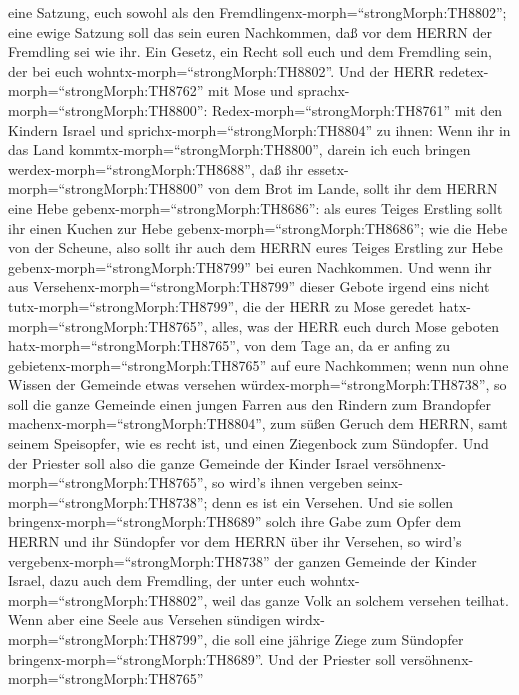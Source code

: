 eine Satzung, euch sowohl als den
Fremdlingenx-morph=``strongMorph:TH8802''; eine ewige Satzung soll das
sein euren Nachkommen, daß vor dem HERRN der Fremdling sei wie ihr.
 Ein Gesetz, ein Recht soll euch und dem Fremdling sein,
der bei euch wohntx-morph=``strongMorph:TH8802''.  Und der
HERR redetex-morph=``strongMorph:TH8762'' mit Mose und
sprachx-morph=``strongMorph:TH8800'': 
Redex-morph=``strongMorph:TH8761'' mit den Kindern Israel und
sprichx-morph=``strongMorph:TH8804'' zu ihnen: Wenn ihr in das Land
kommtx-morph=``strongMorph:TH8800'', darein ich euch bringen
werdex-morph=``strongMorph:TH8688'',  daß ihr
essetx-morph=``strongMorph:TH8800'' von dem Brot im Lande, sollt ihr dem
HERRN eine Hebe gebenx-morph=``strongMorph:TH8686'':  als
eures Teiges Erstling sollt ihr einen Kuchen zur Hebe
gebenx-morph=``strongMorph:TH8686''; wie die Hebe von der Scheune,
 also sollt ihr auch dem HERRN eures Teiges Erstling zur
Hebe gebenx-morph=``strongMorph:TH8799'' bei euren Nachkommen.
 Und wenn ihr aus Versehenx-morph=``strongMorph:TH8799''
dieser Gebote irgend eins nicht tutx-morph=``strongMorph:TH8799'', die
der HERR zu Mose geredet hatx-morph=``strongMorph:TH8765'',
 alles, was der HERR euch durch Mose geboten
hatx-morph=``strongMorph:TH8765'', von dem Tage an, da er anfing zu
gebietenx-morph=``strongMorph:TH8765'' auf eure Nachkommen;
 wenn nun ohne Wissen der Gemeinde etwas versehen
würdex-morph=``strongMorph:TH8738'', so soll die ganze Gemeinde einen
jungen Farren aus den Rindern zum Brandopfer
machenx-morph=``strongMorph:TH8804'', zum süßen Geruch dem HERRN, samt
seinem Speisopfer, wie es recht ist, und einen Ziegenbock zum Sündopfer.
 Und der Priester soll also die ganze Gemeinde der Kinder
Israel versöhnenx-morph=``strongMorph:TH8765'', so wird's ihnen vergeben
seinx-morph=``strongMorph:TH8738''; denn es ist ein Versehen. Und sie
sollen bringenx-morph=``strongMorph:TH8689'' solch ihre Gabe zum Opfer
dem HERRN und ihr Sündopfer vor dem HERRN über ihr Versehen,
 so wird's vergebenx-morph=``strongMorph:TH8738'' der
ganzen Gemeinde der Kinder Israel, dazu auch dem Fremdling, der unter
euch wohntx-morph=``strongMorph:TH8802'', weil das ganze Volk an solchem
versehen teilhat.  Wenn aber eine Seele aus Versehen
sündigen wirdx-morph=``strongMorph:TH8799'', die soll eine jährige Ziege
zum Sündopfer bringenx-morph=``strongMorph:TH8689''.  Und
der Priester soll versöhnenx-morph=``strongMorph:TH8765''
